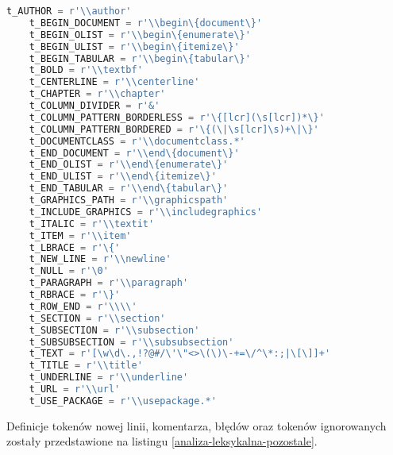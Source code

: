 \begin{lstlisting}[language={Python}, caption={Wyrażenia regularne}, label={analiza-leksykalna-wyrazenia}]
    t_AUTHOR = r'\\author'
    t_BEGIN_DOCUMENT = r'\\begin\{document\}'
    t_BEGIN_OLIST = r'\\begin\{enumerate\}'
    t_BEGIN_ULIST = r'\\begin\{itemize\}'
    t_BEGIN_TABULAR = r'\\begin\{tabular\}'
    t_BOLD = r'\\textbf'
    t_CENTERLINE = r'\\centerline'
    t_CHAPTER = r'\\chapter'
    t_COLUMN_DIVIDER = r'&'
    t_COLUMN_PATTERN_BORDERLESS = r'\{[lcr](\s[lcr])*\}'
    t_COLUMN_PATTERN_BORDERED = r'\{(\|\s[lcr]\s)+\|\}'
    t_DOCUMENTCLASS = r'\\documentclass.*'
    t_END_DOCUMENT = r'\\end\{document\}'
    t_END_OLIST = r'\\end\{enumerate\}'
    t_END_ULIST = r'\\end\{itemize\}'
    t_END_TABULAR = r'\\end\{tabular\}'
    t_GRAPHICS_PATH = r'\\graphicspath'
    t_INCLUDE_GRAPHICS = r'\\includegraphics'
    t_ITALIC = r'\\textit'
    t_ITEM = r'\\item'
    t_LBRACE = r'\{'
    t_NEW_LINE = r'\\newline'
    t_NULL = r'\0'
    t_PARAGRAPH = r'\\paragraph'
    t_RBRACE = r'\}'
    t_ROW_END = r'\\\\'
    t_SECTION = r'\\section'
    t_SUBSECTION = r'\\subsection'
    t_SUBSUBSECTION = r'\\subsubsection'
    t_TEXT = r'[\w\d\.,!?@#/\'\"<>\(\)\-+=\/^\*:;|\[\]]+'
    t_TITLE = r'\\title'
    t_UNDERLINE = r'\\underline'
    t_URL = r'\\url'
    t_USE_PACKAGE = r'\\usepackage.*'
\end{lstlisting}

Definicje tokenów nowej linii, komentarza, błędów oraz tokenów ignorowanych zostały przedstawione na listingu \ref{analiza-leksykalna-pozostale}.


